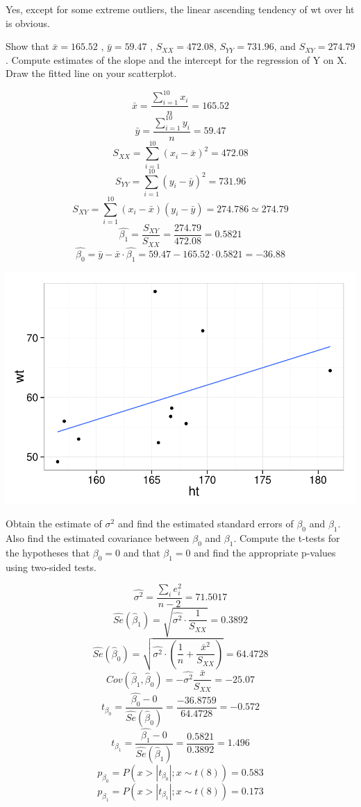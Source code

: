 \documentclass[12pt,oneside,a4paper]{article}\usepackage[]{graphicx}\usepackage[]{xcolor}
\newenvironment{knitrout}{}{} %
\newenvironment{problem}[2][Problem]{\begin{trivlist}
\item[\hskip \labelsep {\bfseries #1}\hskip \labelsep {\bfseries #2.}]}{\end{trivlist}}
\begin{document}
Yes, except for some extreme outliers, the linear ascending tendency of wt over ht is obvious.

\begin{problem}{2.1.2} Show that $\bar{x} = 165.52$ , $\bar{y} = 59.47$ , $S_{XX}  =  472.08$, $S_{YY}  =  731.96$, and $S_{XY} = 274.79$. Compute estimates of the slope and the intercept for the regression of Y on X. Draw the fitted line on your scatterplot.
\end{problem}

$$\bar{x} = \frac{\sum_{i = 1}^{10}{x_{i}}}{n} = 165.52$$
$$\bar{y} = \frac{\sum_{i = 1}^{10}{y_{i}}}{n} = 59.47$$
$$S_{XX} = \sum_{i = 1}^{10}{(x_{i} - \bar{x})^2} = 472.08$$
$$S_{YY} = \sum_{i = 1}^{10}{(y_{i} - \bar{y})^2} = 731.96$$
$$S_{XY} = \sum_{i = 1}^{10}{(x_{i} - \bar{x})(y_{i} - \bar{y})} = 274.786 \simeq 274.79$$
$$\hat{\beta_{1}} = \frac{S_{XY}}{S_{XX}} = \frac{274.79}{472.08}= 0.5821$$
$$\hat{\beta_{0}} = \bar{y} - \bar{x} \cdot \hat{\beta_{1}} = 59.47 - 165.52 \cdot 0.5821 = -36.88$$

\begin{knitrout}
\color{fgcolor}

{\centering \includegraphics[width=.6\linewidth]{figure/p212} 

}



\end{knitrout}

\begin{problem}{2.1.3} Obtain the estimate of $\sigma^2$ and find the estimated standard errors of $\beta_{0}$ and $\beta_{1}$. Also find the estimated covariance between $\beta_{0}$ and $\beta_{1}$. Compute the t-tests for the hypotheses that $\beta_{0} = 0$ and that $\beta_{1} = 0$ and find the appropriate p-values using two-sided tests.
\end{problem}

$$\hat{\sigma ^ 2} = \frac{\sum_{i}{e_{i} ^ 2}}{n - 2} = 71.5017$$
$$\hat{Se}(\hat{\beta}_{1}) = \sqrt{\hat{\sigma ^ 2} \cdot \frac{1}{S_{XX}}} = 0.3892$$
$$\hat{Se}(\hat{\beta}_{0}) = \sqrt{\hat{\sigma ^ 2} \cdot (\frac{1}{n} + \frac{\bar{x} ^ 2}{S_{XX}})} = 64.4728$$
$$Cov(\hat{\beta}_{1}, \hat{\beta}_{0}) = -\hat{\sigma ^ 2} \frac{\bar{x}}{S_{XX}} = -25.07$$
$$t_{\beta_{0}} = \frac{\hat{\beta_{0}} - 0}{\hat{Se}(\hat{\beta}_{0})} = \frac{-36.8759}{64.4728} = -0.572$$
$$t_{\beta_{1}} = \frac{\hat{\beta_{1}} - 0}{\hat{Se}(\hat{\beta}_{1})} = \frac{0.5821}{0.3892} = 1.496$$
$$p_{\beta_{0}} = P(x > |t_{\beta_{0}}|; x \sim t(8)) = 0.583$$
$$p_{\beta_{1}} = P(x > |t_{\beta_{1}}|; x \sim t(8)) = 0.173$$
\\\\
\end{document}
